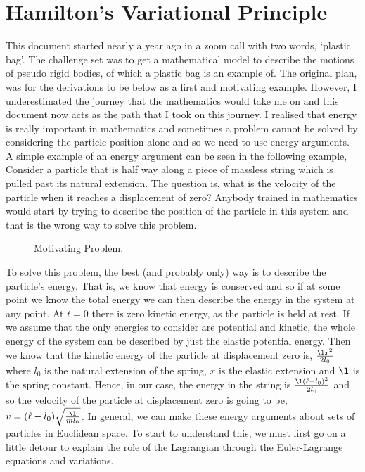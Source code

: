 
\section{Hamilton's Variational Principle}

This document started nearly a year ago in a zoom call with two words, `plastic bag'. The challenge set was to get a mathematical model to describe the motions of pseudo rigid bodies, of which a plastic bag is an example of. The original plan, was for the derivations to be below as a first and motivating example. However, I underestimated the journey that the mathematics would take me on and this document now acts as the path that I took on this journey. I realised that energy is really important in mathematics and sometimes a problem cannot be solved by considering the particle position alone and so we need to use energy arguments. A simple example of an energy argument can be seen in the following example,\\

\noindent
Consider a particle that is half way along a piece of massless string which is pulled past its natural extension. The question is, what is the velocity of the particle when it reaches a displacement of zero? Anybody trained in mathematics would start by trying to describe the position of the particle in this system and that is the wrong way to solve this problem.\\

\begin{figure}[!ht]
\centering
\resizebox{0.2\textwidth}{!}{}
\caption{Motivating Problem.}
\end{figure}

\noindent
To solve this problem, the best (and probably only) way is to describe the particle's energy. That is, we know that energy is conserved and so if at some point we know the total energy we can then describe the energy in the system at any point. At $t = 0$ there is zero kinetic energy, as the particle is held at rest. If we assume that the only energies to consider are potential and kinetic, the whole energy of the system can be described by just the elastic potential energy. Then we know that the kinetic energy of the particle at displacement zero is, $\frac{\l x^2}{2l_0}$ where $l_0$ is the natural extension of the spring, $x$ is the elastic extension and $\l$ is the spring constant. Hence, in our case, the energy in the string is $\frac{\l (\ell - l_0)^2}{2l_0}$ and so the velocity of the particle at displacement zero is going to be, $v = (\ell - l_0)\sqrt{\frac{\l}{ml_0}}$. In general, we can make these energy arguments about sets of particles in Euclidean space. To start to understand this, we must first go on a little detour to explain the role of the Lagrangian through the Euler-Lagrange equations and variations. \\

